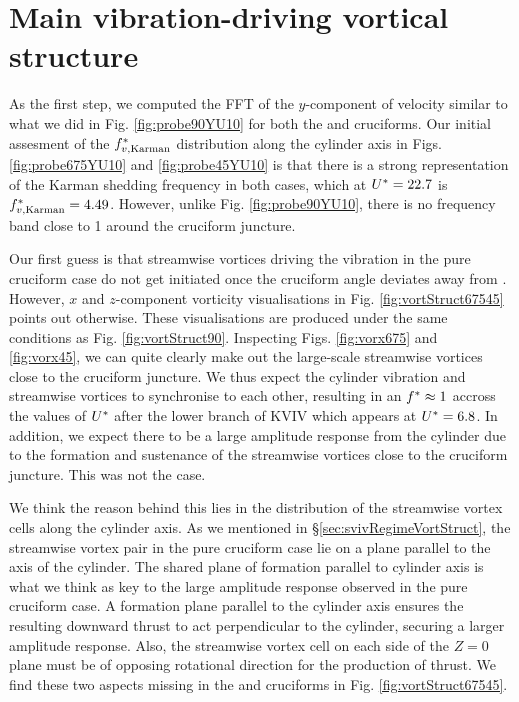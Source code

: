 \documentclass[oneside]{utmthesis}
\begin{document}
\section{Main vibration-driving vortical structure}\label{sec:transitionalRegimeVortStruct}
As the first step, we computed the FFT of the $y$-component of velocity similar to what we did in Fig. \ref{fig:probe90YU10} for both the \angfo{} and \angth{} cruciforms. Our initial assesment of the $f^{*}_{v,\text{Karman}}$ distribution along the cylinder axis in Figs. \ref{fig:probe675YU10} and \ref{fig:probe45YU10} is that there is a strong representation of the Karman shedding frequency in both cases, which at $U^{*} = 22.7$ is $f^{*}_{v,\text{Karman}} = 4.49$. However, unlike Fig. \ref{fig:probe90YU10}, there is no frequency band close to 1 around the cruciform juncture.

Our first guess is that streamwise vortices driving the vibration in the pure cruciform case do not get initiated once the cruciform angle deviates away from \angfi{}. However, $x$ and $z$-component vorticity visualisations in Fig. \ref{fig:vortStruct67545} points out otherwise. These visualisations are produced under the same conditions as Fig. \ref{fig:vortStruct90}. Inspecting Figs. \ref{fig:vorx675} and \ref{fig:vorx45}, we can quite clearly make out the large-scale streamwise vortices close to the cruciform juncture. We thus expect the cylinder vibration and streamwise vortices to synchronise to each other, resulting in an $f^{*} \approx 1$ accross the values of $U^{*}$ after the lower branch of KVIV which appears at $U^{*} = 6.8$. In addition, we expect there to be a large amplitude response from the cylinder due to the formation and sustenance of the streamwise vortices close to the cruciform juncture. This was not the case.

We think the reason behind this lies in the distribution of the streamwise vortex cells along the cylinder axis. As we mentioned in \S\ref{sec:svivRegimeVortStruct}, the streamwise vortex pair in the pure cruciform case lie on a plane parallel to the axis of the cylinder. The shared plane of formation parallel to cylinder axis is what we think as key to the large amplitude response observed in the pure cruciform case. A formation plane parallel to the cylinder axis ensures the resulting downward thrust to act perpendicular to the cylinder, securing a larger amplitude response. Also, the streamwise vortex cell on each side of the $Z = 0$ plane must be of opposing rotational direction for the production of thrust. We find these two aspects missing in the \angfo{} and \angth{} cruciforms in Fig. \ref{fig:vortStruct67545}.
\end{document}
